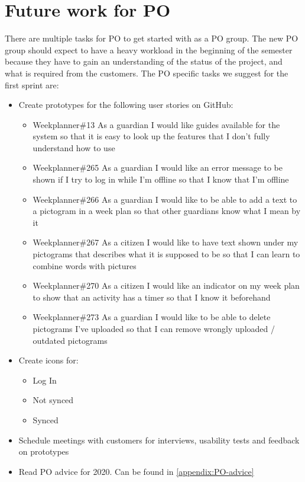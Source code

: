 \section{Future work for PO}
There are multiple tasks for PO to get started with as a PO group.
The new PO group should expect to have a heavy workload in the beginning of the semester because they have to gain an understanding of the status of the project, and what is required from the customers.
The PO specific tasks we suggest for the first sprint are:

\begin{itemize}
    \item Create prototypes for the following user stories on GitHub:
    \begin{itemize}
        \item Weekplanner\#13 As a guardian I would like guides available for the system so that it is easy to look up the features that I don't fully understand how to use
        \item Weekplanner\#265 As a guardian I would like an error message to be shown if I try to log in while I'm offline so that I know that I'm offline
        \item Weekplanner\#266 As a guardian I would like to be able to add a text to a pictogram in a week plan so that other guardians know what I mean by it
        \item Weekplanner\#267 As a citizen I would like to have text shown under my pictograms that describes what it is supposed to be so that I can learn to combine words with pictures 
        \item Weekplanner\#270 As a citizen I would like an indicator on my week plan to show that an activity has a timer so that I know it beforehand
        \item Weekplanner\#273 As a guardian I would like to be able to delete pictograms I've uploaded so that I can remove wrongly uploaded / outdated pictograms 
    \end{itemize}
    \item Create icons for:
    \begin{itemize}
        \item Log In
        \item Not synced
        \item Synced
    \end{itemize}
    \item Schedule meetings with customers for interviews, usability tests and feedback on prototypes
    \item Read PO advice for 2020. Can be found in \autoref{appendix:PO-advice}
\end{itemize}
